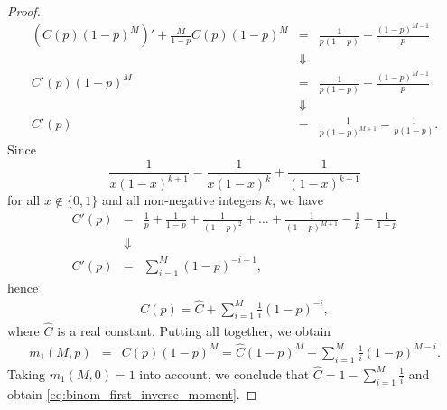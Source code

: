 \begin{proof}
    \begin{eqnarray*}
        \left(C(p)(1-p)^M\right)' + \frac{M}{1-p}C(p)(1-p)^M &=& \frac{1}{p(1-p)} - \frac{(1-p)^{M-1}}{p}\\
        &\Downarrow&\\
        C'(p)(1-p)^M &=& \frac{1}{p(1-p)} - \frac{(1-p)^{M-1}}{p}\\
        &\Downarrow&\\
        C'(p) &=& \frac{1}{p(1-p)^{M+1}} - \frac{1}{p(1-p)}.
    \end{eqnarray*}
    Since 
    \begin{equation}
        \frac{1}{x(1-x)^{k+1}} = \frac{1}{x(1-x)^{k}} + \frac{1}{(1-x)^{k+1}}\label{eq:technical_expansion}
    \end{equation}
    for all $x\not\in \{0,1\}$ and all non-negative integers $k$, we have
    \begin{eqnarray*}
        C'(p) &=& \frac{1}{p} + \frac{1}{1-p} + \frac{1}{(1-p)^2} + \ldots + \frac{1}{(1-p)^{M+1}} - \frac{1}{p} - \frac{1}{1-p}\\
        &\Downarrow&\\
        C'(p) &=& \sum\limits_{i=1}^M(1-p)^{-i-1},
    \end{eqnarray*}
    hence
    \begin{eqnarray*}
        C(p) = \hat{C} + \sum\limits_{i=1}^M\frac{1}{i}(1-p)^{-i},
    \end{eqnarray*}
    where $\hat{C}$ is a real constant. Putting all together, we obtain
    \begin{eqnarray*}
        m_1(M,p) &=& C(p)(1-p)^M = \hat{C}(1-p)^M + \sum\limits_{i=1}^M\frac{1}{i}(1-p)^{M-i}.
    \end{eqnarray*}
    Taking $m_1(M,0) = 1$ into account, we conclude that $\hat{C} = 1 - \sum_{i=1}^M\frac{1}{i}$ and obtain \eqref{eq:binom_first_inverse_moment}.
    

\end{proof}
